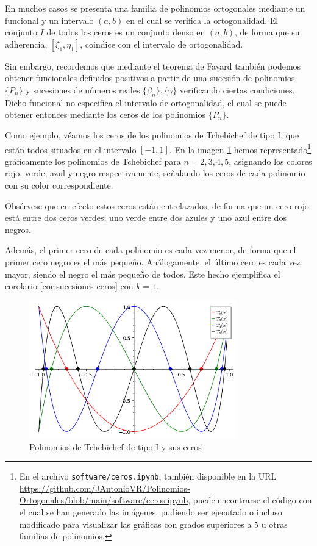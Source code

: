 En muchos casos se presenta una familia de polinomios ortogonales mediante un funcional y un intervalo $(a,b)$ en el cual se verifica la ortogonalidad. El conjunto $I$ de todos los ceros es un conjunto denso en $(a,b)$, de forma que su adherencia, $[\xi_1,\eta_1]$, coindice con el intervalo de ortogonalidad.

Sin embargo, recordemos que mediante el teorema de Favard también podemos obtener funcionales definidos positivos a partir de una sucesión de polinomios $\{P_n\}$ y sucesiones de números reales $\{\beta_n\}, \{\gamma\}$ verificando ciertas condiciones. Dicho funcional no especifica el intervalo de ortogonalidad, el cual se puede obtener entonces mediante los ceros de los polinomios $\{P_n\}$.


\begin{ejemplo}
    Como ejemplo, véamos los ceros de los polinomios de Tchebichef de tipo I, que están todos situados en el intervalo $[-1,1]$. En la imagen \ref{img:ejemplo-ceros} hemos representado\footnote{En el archivo \texttt{software/ceros.ipynb}, también disponible en la URL \url{https://github.com/JAntonioVR/Polinomios-Ortogonales/blob/main/software/ceros.ipynb}, puede encontrarse el código con el cual se han generado las imágenes, pudiendo ser ejecutado o incluso modificado para visualizar las gráficas con grados superiores a $5$ u otras familias de polinomios.} gráficamente los polinomios de Tchebichef para $n=2,3,4,5$, asignando los colores rojo, verde, azul y negro respectivamente, señalando los ceros de cada polinomio con su color correspondiente. 

    Obsérvese que en efecto estos ceros están entrelazados, de forma que un cero rojo está entre dos ceros verdes; uno verde entre dos azules y uno azul entre dos negros.

    Además, el primer cero de cada polinomio es cada vez menor, de forma que el primer cero negro es el más pequeño. Análogamente, el último cero es cada vez mayor, siendo el negro el más pequeño de todos. Este hecho ejemplifica el corolario \ref{cor:sucesiones-ceros} con $k=1$.
    
    \begin{figure}[h]
        \centering
        \includegraphics[width=9cm]{img/C1/ceros.png}
        \caption{Polinomios de Tchebichef de tipo I y sus ceros}
        \label{img:ejemplo-ceros}
    \end{figure}

    
\end{ejemplo}

